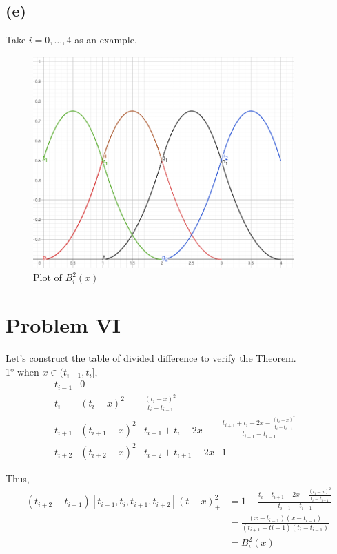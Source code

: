 \documentclass[UTF8]{ctexart}
\begin{document}
\subsection*{(e)}
Take $i = 0,\dots,4$ as an example,

\begin{figure}[htp]
    \centering
    \includegraphics[width=10cm]{plot1.png}
    \caption{Plot of $B_i^2(x)$}
    \label{fig:1L}
\end{figure}



\section*{Problem VI}
\noindent Let's construct the table of divided difference to verify the Theorem.\\
1° when $x \in (t_{i-1}, t_{i}],$
\begin{equation}
    \begin{array}{c|ccc}
    t_{i-1} & 0 & & \\
    t_{i} & \left(t_{i}-x\right)^{2} & \frac{\left(t_{i}-x\right)^{2}}{t_{i}-t_{i-1}} & & \\
    t_{i+1} & \left(t_{i+1}-x\right)^{2} & t_{i+1}+t_{i}-2 x & \frac{t_{i+1}+t_{i}-2 x-\frac{\left(t_{i}-x\right)^{2}}{t_{i}-t_{i-1}}}{t_{i+1}-t_{i-1}} & \\
    t_{i+2} & \left(t_{i+2}-x\right)^{2} & t_{i+2}+t_{i+1}-2 x & 1 
    \nonumber
    \end{array}
\end{equation}

\noindent Thus,
\begin{equation}
    \begin{aligned}
        \left(t_{i+2}-t_{i-1}\right)\left[t_{i-1}, t_{i}, t_{i+1}, t_{i+2}\right](t-x)_{+}^{2} &= 1-\frac{t_{i}+t_{i+1}-2 x-\frac{\left(t_{i}-x\right)^{2}}{t_{i}-t_{i-1}}}{t_{i+1}-t_{i-1}}\\ 
        &= \frac{\left(x-t_{i-1}\right)\left(x-t_{i-1}\right)}{\left(t_{i+1}-t i-1\right)\left(t_{i}-t_{i-1}\right)}\\ 
        &= B_i^2(x)
    \nonumber    
    \end{aligned}
\end{equation}
\end{document}
